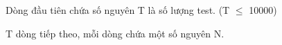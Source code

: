 Dòng đầu tiên chứa số nguyên T là số lượng test. (T  $\le$  10000)  

   T dòng tiếp theo, mỗi dòng chứa một số nguyên N.  

\